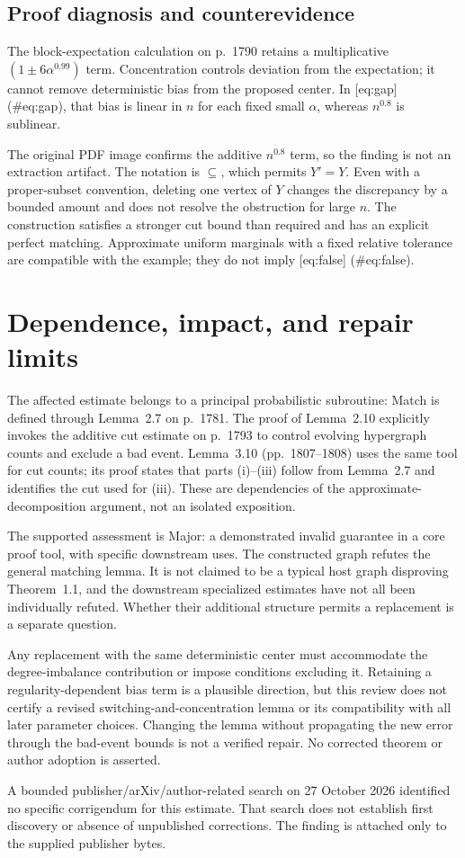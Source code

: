 \documentclass[10pt]{article}
\begin{document}
\subsection*{Proof diagnosis and counterevidence}
The block-expectation calculation on p. 1790 retains a multiplicative \((1\pm6\alpha^{0.99})\) term. Concentration controls deviation from the expectation; it cannot remove deterministic bias from the proposed center. In [eq:gap] (\#eq:gap), that bias is linear in \(n\) for each fixed small \(\alpha\), whereas \(n^{0.8}\) is sublinear.\par
The original PDF image confirms the additive \(n^{0.8}\) term, so the finding is not an extraction artifact. The notation is \(\subseteq\), which permits \(Y'=Y\). Even with a proper-subset convention, deleting one vertex of \(Y\) changes the discrepancy by a bounded amount and does not resolve the obstruction for large \(n\). The construction satisfies a stronger cut bound than required and has an explicit perfect matching. Approximate uniform marginals with a fixed relative tolerance are compatible with the example; they do not imply [eq:false] (\#eq:false).\par
\section*{Dependence, impact, and repair limits}
The affected estimate belongs to a principal probabilistic subroutine: Match is defined through Lemma 2.7 on p. 1781. The proof of Lemma 2.10 explicitly invokes the additive cut estimate on p. 1793 to control evolving hypergraph counts and exclude a bad event. Lemma 3.10 (pp. 1807–1808) uses the same tool for cut counts; its proof states that parts (i)–(iii) follow from Lemma 2.7 and identifies the cut used for (iii). These are dependencies of the approximate-decomposition argument, not an isolated exposition.\par
The supported assessment is Major: a demonstrated invalid guarantee in a core proof tool, with specific downstream uses. The constructed graph refutes the general matching lemma. It is not claimed to be a typical host graph disproving Theorem 1.1, and the downstream specialized estimates have not all been individually refuted. Whether their additional structure permits a replacement is a separate question.\par
Any replacement with the same deterministic center must accommodate the degree-imbalance contribution or impose conditions excluding it. Retaining a regularity-dependent bias term is a plausible direction, but this review does not certify a revised switching-and-concentration lemma or its compatibility with all later parameter choices. Changing the lemma without propagating the new error through the bad-event bounds is not a verified repair. No corrected theorem or author adoption is asserted.\par
A bounded publisher/arXiv/author-related search on 27 October 2026 identified no specific corrigendum for this estimate. That search does not establish first discovery or absence of unpublished corrections. The finding is attached only to the supplied publisher bytes.\par
\end{document}
